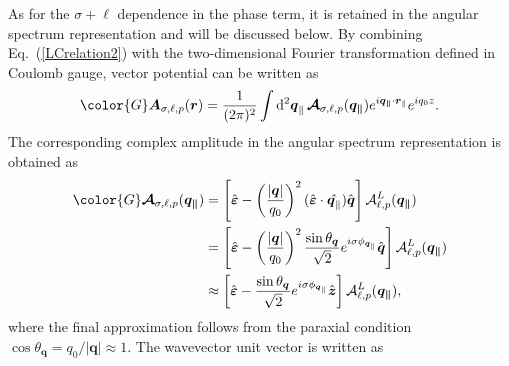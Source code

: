 %
%
%
%
As for the $\sigma+\ell$ dependence in the phase term, it is retained in the angular spectrum representation and will be discussed below. By combining Eq.~(\ref{LCrelation2}) with the two-dimensional Fourier transformation defined in Coulomb gauge, vector potential can be written as
\begin{equation}
\color{G}
\boldsymbol{A}_{\sigma, \ell, p}(\boldsymbol{r})
=
\frac{1}{(2\pi)^2}
\int {\rm d}^2 \boldsymbol{q}_\parallel
\,
\boldsymbol{\mathcal{A}}_{\sigma, \ell, p}(\boldsymbol{q_\parallel})
e^{i\boldsymbol{q_\parallel}\cdot \boldsymbol{r}_\parallel}
e^{iq_0 z}.
\label{planwaveinC}
\end{equation}
The corresponding complex amplitude in the angular spectrum representation is obtained as
\begin{align}
\color{G}
\boldsymbol{\mathcal{A}}_{\sigma, \ell, p}(\boldsymbol{q_\parallel})
&=
\left[
\hat{\boldsymbol{\varepsilon}}
-
\left(
\frac{|\boldsymbol{q}|}{q_0}
\right)^2
(\hat{\boldsymbol{\varepsilon}}\cdot\hat{\boldsymbol{q}_\parallel})
\hat{\boldsymbol{q}}
\right]
\mathcal{A}^L_{\ell, p}(\boldsymbol{q_\parallel}) \\
&=
\left[
\hat{\boldsymbol{\varepsilon}}
-
\left(
\frac{|\boldsymbol{q}|}{q_0}
\right)^2
\frac{\sin\theta_{\boldsymbol{q}}}{\sqrt{2}}
e^{i\sigma\phi_{\boldsymbol{q}_\parallel}}
\hat{\boldsymbol{q}}
\right]
\mathcal{A}^L_{\ell, p}(\boldsymbol{q_\parallel}) \label{sigma_limit} \\
&\approx
\left[
\hat{\boldsymbol{\varepsilon}}
-
\frac{\sin\theta_{\boldsymbol{q}}}{\sqrt{2}}
e^{i\sigma\phi_{\boldsymbol{q}_\parallel}}
\hat{\boldsymbol{z}}
\right]
\mathcal{A}^L_{\ell, p}(\boldsymbol{q_\parallel}),
\label{approx_to_1}
\end{align}
where the final approximation follows from the paraxial condition $\cos\theta_{\boldsymbol{q}} = q_0/|\boldsymbol{q}| \approx 1$. The wavevector unit vector is written as

